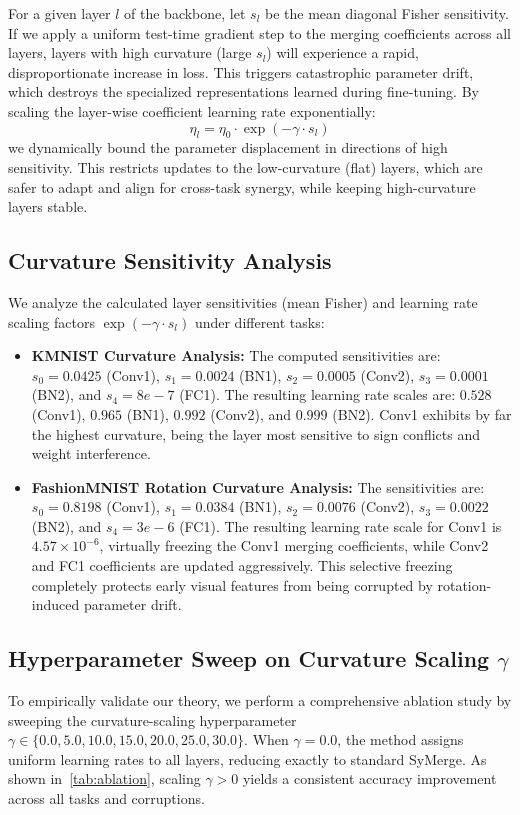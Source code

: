 \documentclass{article}
\begin{document}
For a given layer $l$ of the backbone, let $s_l$ be the mean diagonal Fisher sensitivity. If we apply a uniform test-time gradient step to the merging coefficients across all layers, layers with high curvature (large $s_l$) will experience a rapid, disproportionate increase in loss. This triggers catastrophic parameter drift, which destroys the specialized representations learned during fine-tuning. By scaling the layer-wise coefficient learning rate exponentially:
\begin{equation}
    \eta_l = \eta_0 \cdot \exp(-\gamma \cdot s_l)
\end{equation}
we dynamically bound the parameter displacement in directions of high sensitivity. This restricts updates to the low-curvature (flat) layers, which are safer to adapt and align for cross-task synergy, while keeping high-curvature layers stable.

\subsection{Curvature Sensitivity Analysis}
We analyze the calculated layer sensitivities (mean Fisher) and learning rate scaling factors $\exp(-\gamma \cdot s_l)$ under different tasks:
\begin{itemize}\itemsep=0pt\parsep=0pt\topsep=2pt
    \item \textbf{KMNIST Curvature Analysis:} The computed sensitivities are: $s_0=0.0425$ (Conv1), $s_1=0.0024$ (BN1), $s_2=0.0005$ (Conv2), $s_3=0.0001$ (BN2), and $s_4=8e-7$ (FC1). The resulting learning rate scales are: $0.528$ (Conv1), $0.965$ (BN1), $0.992$ (Conv2), and $0.999$ (BN2). Conv1 exhibits by far the highest curvature, being the layer most sensitive to sign conflicts and weight interference.
    \item \textbf{FashionMNIST Rotation Curvature Analysis:} The sensitivities are: $s_0=0.8198$ (Conv1), $s_1=0.0384$ (BN1), $s_2=0.0076$ (Conv2), $s_3=0.0022$ (BN2), and $s_4=3e-6$ (FC1). The resulting learning rate scale for Conv1 is \textbf{$4.57 \times 10^{-6}$}, virtually freezing the Conv1 merging coefficients, while Conv2 and FC1 coefficients are updated aggressively. This selective freezing completely protects early visual features from being corrupted by rotation-induced parameter drift.
\end{itemize}


\subsection{Hyperparameter Sweep on Curvature Scaling $\gamma$}
To empirically validate our theory, we perform a comprehensive ablation study by sweeping the curvature-scaling hyperparameter $\gamma \in \{0.0, 5.0, 10.0, 15.0, 20.0, 25.0, 30.0\}$. When $\gamma = 0.0$, the method assigns uniform learning rates to all layers, reducing exactly to standard SyMerge. As shown in~\cref{tab:ablation}, scaling $\gamma > 0$ yields a consistent accuracy improvement across all tasks and corruptions.
\end{document}
